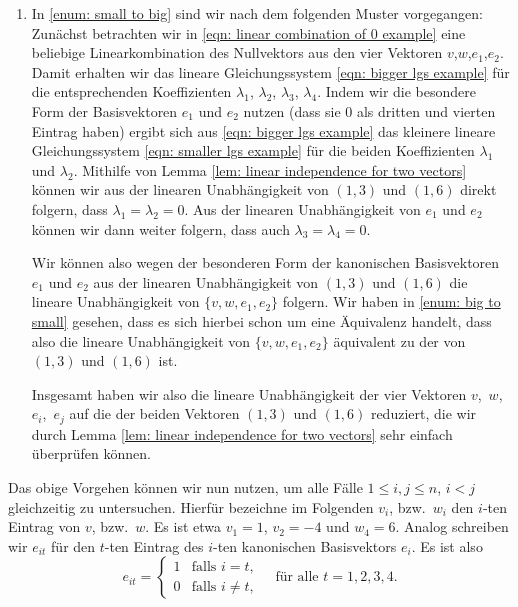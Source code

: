 \documentclass[a4paper,10pt]{article}
\begin{document}
\begin{bsp}
\begin{enumerate}[label=\alph*)]
  \item
   In \ref{enum: small to big} sind wir nach dem folgenden Muster vorgegangen: Zunächst betrachten wir in \eqref{eqn: linear combination of 0 example} eine beliebige Linearkombination des Nullvektors aus den vier Vektoren $v$,$w$,$e_1$,$e_2$. Damit erhalten wir das lineare Gleichungssystem \eqref{eqn: bigger lgs example} für die entsprechenden Koeffizienten $\lambda_1$, $\lambda_2$, $\lambda_3$, $\lambda_4$. Indem wir die besondere Form der Basisvektoren $e_1$ und $e_2$ nutzen (dass sie $0$ als dritten und vierten Eintrag haben) ergibt sich aus \eqref{eqn: bigger lgs example} das kleinere lineare Gleichungssystem \eqref{eqn: smaller lgs example} für die beiden Koeffizienten $\lambda_1$ und $\lambda_2$. Mithilfe von Lemma \ref{lem: linear independence for two vectors} können wir aus der linearen Unabhängigkeit von $(1,3)$ und $(1,6)$ direkt folgern, dass $\lambda_1 = \lambda_2 = 0$. Aus der linearen Unabhängigkeit von $e_1$ und $e_2$ können wir dann weiter folgern, dass auch $\lambda_3 = \lambda_4 = 0$.
   
   Wir können also wegen der besonderen Form der kanonischen Basisvektoren $e_1$ und $e_2$ aus der linearen Unabhängigkeit von $(1,3)$ und $(1,6)$ die lineare Unabhängigkeit von $\{v,w,e_1,e_2\}$ folgern. Wir haben in \ref{enum: big to small} gesehen, dass es sich hierbei schon um eine Äquivalenz handelt, dass also die lineare Unabhängigkeit von $\{v,w,e_1,e_2\}$ äquivalent zu der von $(1,3)$ und $(1,6)$ ist.
   
   Insgesamt haben wir also die lineare Unabhängigkeit der vier Vektoren \mbox{$v$, $w$, $e_i$, $e_j$} auf die der beiden Vektoren $(1,3)$ und $(1,6)$ reduziert, die wir durch Lemma \ref{lem: linear independence for two vectors} sehr einfach überprüfen können.
 \end{enumerate}
\end{bsp}


Das obige Vorgehen können wir nun nutzen, um alle Fälle $1 \leq i,j \leq n$, $i < j$ gleichzeitig zu untersuchen. Hierfür bezeichne im Folgenden $v_i$, bzw.\ $w_i$ den $i$-ten Eintrag von $v$, bzw.\ $w$. Es ist etwa $v_1 = 1$, $v_2 = -4$ und $w_4 = 6$. Analog schreiben wir $e_{it}$ für den $t$-ten Eintrag des $i$-ten kanonischen Basisvektors $e_i$. Es ist also
\begin{equation}\label{eqn: entries of standard basis vectors}
 e_{it} =
 \begin{cases}
  1 & \text{falls $i = t$}, \\
  0 & \text{falls $i \neq t$},
 \end{cases}
 \quad
 \text{für alle $t=1,2,3,4$}.
\end{equation}
\end{document}

